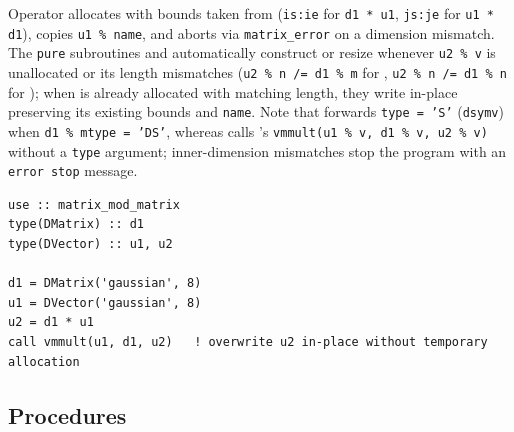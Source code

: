 Operator \procname{*} allocates  with bounds taken from  (\texttt{is:ie} for \texttt{d1 * u1}, \texttt{js:je} for \texttt{u1 * d1}), copies \texttt{u1 \% name}, and aborts via \texttt{matrix\_error} on a dimension mismatch. The \texttt{pure} subroutines  and  automatically construct or resize  whenever \texttt{u2 \% v} is unallocated or its length mismatches (\texttt{u2 \% n /= d1 \% m} for , \texttt{u2 \% n /= d1 \% n} for ); when  is already allocated with matching length, they write in-place preserving its existing bounds and \texttt{name}. Note that  forwards \texttt{type = 'S'} (\texttt{dsymv}) when \texttt{d1 \% mtype = 'DS'}, whereas  calls 's \texttt{vmmult(u1 \% v, d1 \% v, u2 \% v)} without a \texttt{type} argument; inner-dimension mismatches stop the program with an \texttt{error stop} message.

\begin{description}[leftmargin=2.2cm, style=nextline]
\end{description}

\lstset{language=[95]Fortran}
\begin{lstlisting}
use :: matrix_mod_matrix
type(DMatrix) :: d1
type(DVector) :: u1, u2

d1 = DMatrix('gaussian', 8)
u1 = DVector('gaussian', 8)
u2 = d1 * u1
call vmmult(u1, d1, u2)   ! overwrite u2 in-place without temporary allocation
\end{lstlisting}

\subsection{Procedures}
\label{subsec:dvec_procs}



